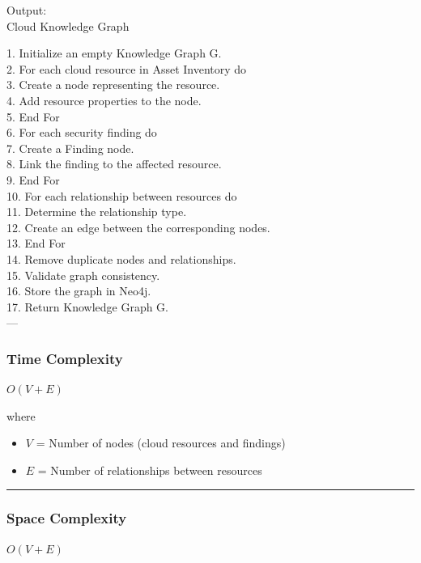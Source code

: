 Output:\\
Cloud Knowledge Graph

1. Initialize an empty Knowledge Graph G.\\
2. For each cloud resource in Asset Inventory do\\
3. Create a node representing the resource.\\
4. Add resource properties to the node.\\
5. End For\\
6. For each security finding do\\
7. Create a Finding node.\\
8. Link the finding to the affected resource.\\
9. End For\\
10. For each relationship between resources do\\
11. Determine the relationship type.\\
12. Create an edge between the corresponding nodes.\\
13. End For\\
14. Remove duplicate nodes and relationships.\\
15. Validate graph consistency.\\
16. Store the graph in Neo4j.\\
17. Return Knowledge Graph G.\\
---

\subsubsection{Time Complexity}

$O(V + E)$

where

\begin{itemize}
\tightlist
\item
$V$ = Number of nodes (cloud resources and findings)\\
\item
$E$ = Number of relationships between resources
\end{itemize}

\begin{center}\rule{0.5\linewidth}{0.5pt}\end{center}

\subsubsection{Space Complexity}

$O(V + E)$

